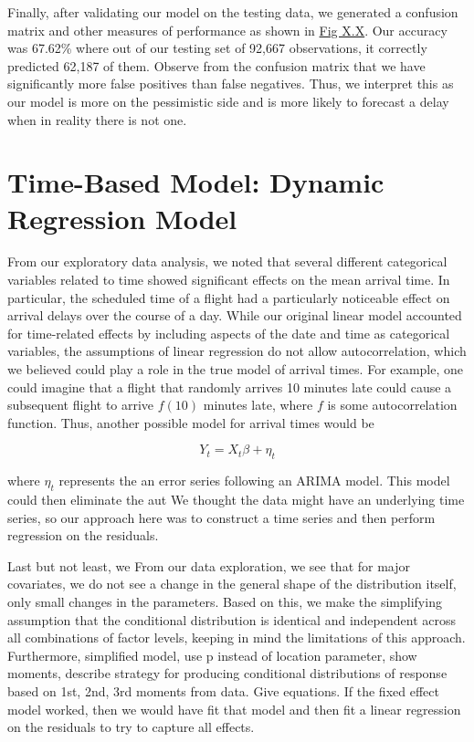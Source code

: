\documentclass[12pt, a4paper, openany]{book}
\newcommand\tab[1][1cm]{\hspace*{#1}}
\begin{document}
	\tab Finally, after validating our model on the testing data, we generated a confusion matrix and other measures of performance as shown in \underline{Fig X.X}. Our accuracy was 67.62\% where out of our testing set of 92,667 observations, it correctly predicted 62,187 of them. Observe from the confusion matrix that we have significantly more false positives than false negatives. Thus, we interpret this as our model is more on the pessimistic side and is more likely to forecast a delay when in reality there is not one. \\

	\section{Time-Based Model: Dynamic Regression Model}
	\tab From our exploratory data analysis, we noted that several different categorical variables related to time showed significant effects on the mean arrival time. In particular, the scheduled time of a flight had a particularly noticeable effect on arrival delays over the course of a day. While our original linear model accounted for time-related effects by including aspects of the date and time as categorical variables, the assumptions of linear regression do not allow autocorrelation, which we believed could play a role in the true model of arrival times. For example, one could imagine that a flight that randomly arrives 10 minutes late could cause a subsequent flight to arrive $f(10)$ minutes late, where $f$ is some autocorrelation function. Thus, another possible model for arrival times would be 
	\begin{center}
	$$Y_t = X_t\beta + \eta_t$$
	\end{center}
	where $\eta_t$ represents the an error series following an ARIMA model. This model could then eliminate the aut We thought the data might have an underlying time series, so our approach here was to construct a time series and then perform regression on the residuals. 

	\tab Last but not least, we   From our data exploration, we see that for major covariates, we do not see a change in the general shape of the distribution itself, only small changes in the parameters. Based on this, we make the simplifying assumption that the conditional distribution is identical and independent across all combinations of factor levels, keeping in mind the limitations of this approach.  Furthermore, simplified model, use p instead of location parameter, show moments, describe strategy for producing conditional distributions of response based on 1st, 2nd, 3rd moments from data. Give equations. If the fixed effect model worked, then we would have fit that model and then fit a linear regression on the residuals to try to capture all effects. \\
	
\end{document}
